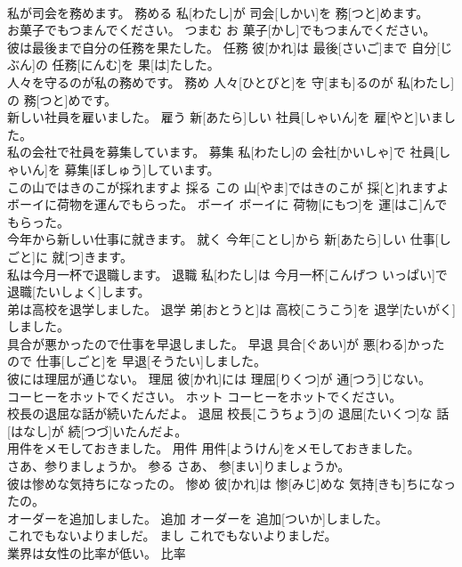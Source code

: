 \documentclass[8pt]{extreport}
\begin{document}
\begin{CJK}{UTF8}{min}
\\	私が司会を務めます。	務める	私[わたし]が 司会[しかい]を 務[つと]めます。	
\\	お菓子でもつまんでください。	つまむ	お 菓子[かし]でもつまんでください。	
\\	彼は最後まで自分の任務を果たした。	任務	彼[かれ]は 最後[さいご]まで 自分[じぶん]の 任務[にんむ]を 果[は]たした。	
\\	人々を守るのが私の務めです。	務め	人々[ひとびと]を 守[まも]るのが 私[わたし]の 務[つと]めです。	
\\	新しい社員を雇いました。	雇う	新[あたら]しい 社員[しゃいん]を 雇[やと]いました。	
\\	私の会社で社員を募集しています。	募集	私[わたし]の 会社[かいしゃ]で 社員[しゃいん]を 募集[ぼしゅう]しています。	
\\	この山ではきのこが採れますよ	採る	この 山[やま]ではきのこが 採[と]れますよ	
\\	ボーイに荷物を運んでもらった。	ボーイ	ボーイに 荷物[にもつ]を 運[はこ]んでもらった。	
\\	今年から新しい仕事に就きます。	就く	今年[ことし]から 新[あたら]しい 仕事[しごと]に 就[つ]きます。	
\\	私は今月一杯で退職します。	退職	私[わたし]は 今月一杯[こんげつ いっぱい]で 退職[たいしょく]します。	
\\	弟は高校を退学しました。	退学	弟[おとうと]は 高校[こうこう]を 退学[たいがく]しました。	
\\	具合が悪かったので仕事を早退しました。	早退	具合[ぐあい]が 悪[わる]かったので 仕事[しごと]を 早退[そうたい]しました。	
\\	彼には理屈が通じない。	理屈	彼[かれ]には 理屈[りくつ]が 通[つう]じない。	
\\	コーヒーをホットでください。	ホット	コーヒーをホットでください。	
\\	校長の退屈な話が続いたんだよ。	退屈	校長[こうちょう]の 退屈[たいくつ]な 話[はなし]が 続[つづ]いたんだよ。	
\\	用件をメモしておきました。	用件	用件[ようけん]をメモしておきました。	
\\	さあ、参りましょうか。	参る	さあ、 参[まい]りましょうか。	
\\	彼は惨めな気持ちになったの。	惨め	彼[かれ]は 惨[みじ]めな 気持[きも]ちになったの。	
\\	オーダーを追加しました。	追加	オーダーを 追加[ついか]しました。	
\\	これでもないよりましだ。	まし	これでもないよりましだ。	
\\	業界は女性の比率が低い。	比率	

\end{CJK}
\end{document}
